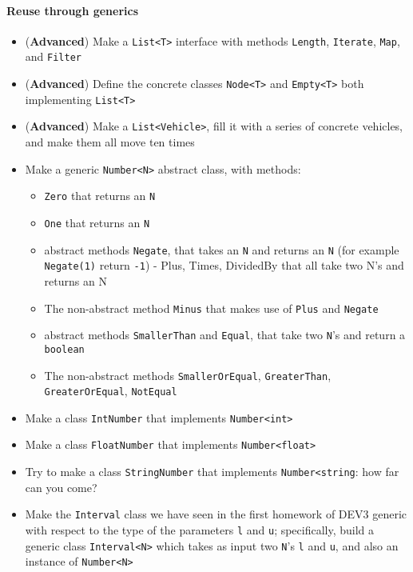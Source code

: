 \documentclass[12pt,a4paper,final]{article}
\begin{document}
		\paragraph{Reuse through generics}
		\begin{itemize}
			\item (\textbf{Advanced}) Make a \texttt{List<T>} interface with methods \texttt{Length}, \texttt{Iterate}, \texttt{Map}, and \texttt{Filter}
			\item (\textbf{Advanced}) Define the concrete classes \texttt{Node<T>} and \texttt{Empty<T>} both implementing \texttt{List<T>}
			\item (\textbf{Advanced}) Make a \texttt{List<Vehicle>}, fill it with a series of concrete vehicles, and make them all move ten times
			\item Make a generic \texttt{Number<N>} abstract class, with methods:
			\begin{itemize}
				\item \texttt{Zero} that returns an \texttt{N}
				\item \texttt{One} that returns an \texttt{N}
				\item abstract methods \texttt{Negate}, that takes an \texttt{N} and returns an \texttt{N} (for example \texttt{Negate(1)} return \texttt{-1})
				- Plus, Times, DividedBy that all take two N's and returns an N
				\item The non-abstract method \texttt{Minus} that makes use of \texttt{Plus} and \texttt{Negate}
				\item abstract methods \texttt{SmallerThan} and \texttt{Equal}, that take two \texttt{N}'s and return a \texttt{boolean}
				\item The non-abstract methods \texttt{SmallerOrEqual}, \texttt{GreaterThan}, \texttt{GreaterOrEqual}, \texttt{NotEqual}
			\end{itemize}
			
			\item Make a class \texttt{IntNumber} that implements \texttt{Number<int>}
			\item Make a class \texttt{FloatNumber} that implements \texttt{Number<float>}
			\item Try to make a class \texttt{StringNumber} that implements \texttt{Number<string}: how far can you come?
			
			\item Make the \texttt{Interval} class we have seen in the first homework of DEV3 generic with respect to the type of the parameters \texttt{l} and \texttt{u}; specifically, build a generic class \texttt{Interval<N>} which takes as input two \texttt{N}'s \texttt{l} and \texttt{u}, and also an instance of \texttt{Number<N>}
		\end{itemize}
\end{document}
